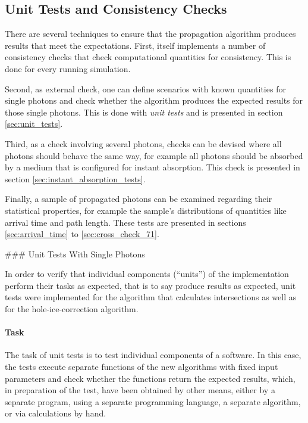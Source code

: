 
\subsection{Unit Tests and Consistency Checks}
\label{sec:unit_tests_and_cross_checks}

There are several techniques to ensure that the propagation algorithm produces results that meet the expectations. First, \clsim itself implements a number of consistency checks that check computational quantities for consistency. This is done for every running simulation. \cite{clsimsource}

Second, as external check, one can define scenarios with known quantities for single photons and check whether the algorithm produces the expected results for those single photons. This is done with \textit{unit tests} and is presented in section \ref{sec:unit_tests}.

Third, as a check involving several photons, checks can be devised where all photons should behave the same way, for example all photons should be absorbed by a medium that is configured for instant absorption. This check is presented in section \ref{sec:instant_absorption_tests}.

Finally, a sample of propagated photons can be examined regarding their statistical properties, for example the sample's distributions of quantities like arrival time and path length. These tests are presented in sections \ref{sec:arrival_time} to \ref{sec:cross_check_71}.


### Unit Tests With Single Photons
\label{sec:unit_tests}

In order to verify that individual components (``units'') of the implementation perform their tasks as expected, that is to say produce results as expected, unit tests were implemented for the algorithm that calculates intersections as well as for the hole-ice-correction algorithm.


\paragraph{Task} The task of unit tests is to test individual components of a software. In this case, the tests execute separate functions of the new algorithms with fixed input parameters and check whether the functions return the expected results, which, in preparation of the test, have been obtained by other means, either by a separate program, using a separate programming language, a separate algorithm, or via calculations by hand.

